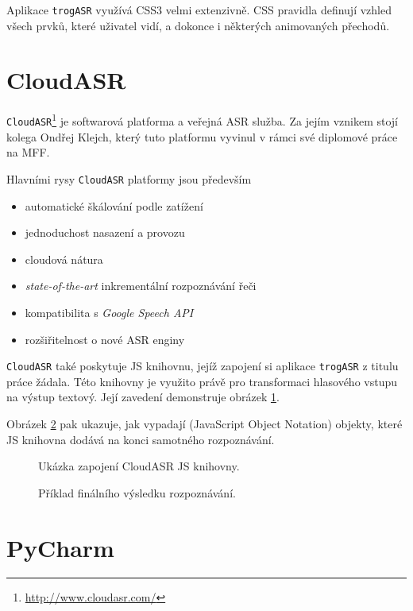 Aplikace \verb|trogASR| využívá CSS3 velmi extenzivně. CSS pravidla definují vzhled všech prvků, které uživatel vidí, a dokonce i některých animovaných přechodů.

\section{CloudASR}

\verb|CloudASR|\footnote{\url{http://www.cloudasr.com/}} je softwarová platforma a veřejná ASR služba. Za jejím vznikem stojí kolega Ondřej Klejch, který tuto platformu vyvinul v rámci své diplomové práce na MFF.

Hlavními rysy \verb|CloudASR| platformy jsou především 

\begin{itemize}
\item automatické škálování podle zatížení
\item jednoduchost nasazení a provozu
\item cloudová nátura
\item {\sl state-of-the-art} inkrementální rozpoznávání řeči
\item kompatibilita s {\sl Google Speech API}
\item rozšiřitelnost o nové ASR enginy
\end{itemize}

\verb|CloudASR| také poskytuje JS knihovnu, jejíž zapojení si aplikace \verb|trogASR| z titulu práce žádala. Této knihovny je využito právě pro transformaci hlasového vstupu na výstup textový. Její zavedení demonstruje obrázek \ref{fig:cloudasr}.

Obrázek \ref{fig:cloudasr_final} pak ukazuje, jak vypadají  (JavaScript Object Notation) objekty, které JS knihovna dodává na konci samotného rozpoznávání.

\begin{figure}[h]
	
	\caption{Ukázka zapojení CloudASR JS knihovny.}
	\label{fig:cloudasr}
\end{figure}

\begin{figure}[h]
	
	\caption{Příklad finálního výsledku rozpoznávání.}
	\label{fig:cloudasr_final}
\end{figure}

\section{PyCharm}


